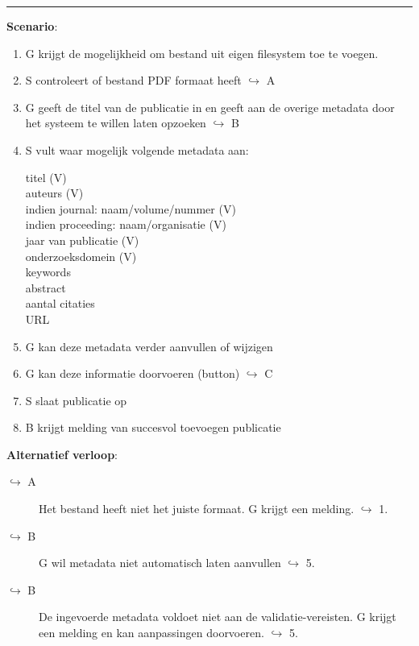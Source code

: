 \hrule
\vspace{2 mm}
\noindent \textbf{Scenario}:
\begin{enumerate}
\item G krijgt de mogelijkheid om bestand uit eigen filesystem toe te voegen.
\item S controleert of bestand PDF formaat heeft $\hookrightarrow$ A
\item G geeft de titel van de publicatie in en geeft aan de overige metadata door het systeem te willen laten opzoeken $\hookrightarrow$ B
\item S vult waar mogelijk volgende metadata aan:
\begin{description}
  \item[titel (V)]  \hfill 
  \item[auteurs (V) ] \hfill 
  \item[indien journal: naam/volume/nummer (V)] \hfill 
  \item[indien proceeding: naam/organisatie (V)] \hfill 
  \item[jaar van publicatie (V) ] \hfill 
  \item[onderzoeksdomein (V)]  \hfill 
  \item[keywords]  \hfill 
  \item[abstract] \hfill 
   \item[aantal citaties] \hfill 
    \item[URL] \hfill 
  \end{description}
\item G kan deze metadata verder aanvullen of wijzigen 
 \item G kan deze informatie doorvoeren (button)  $\hookrightarrow$ C
 \item S slaat publicatie op   
 \item B krijgt melding van succesvol toevoegen publicatie 
\end{enumerate}
\noindent \textbf{Alternatief verloop}:
\begin{description}
\item[ $\hookrightarrow$ A] Het bestand heeft niet het juiste formaat. G krijgt een melding. $\hookrightarrow$ 1.
\item[ $\hookrightarrow$ B] G wil metadata niet automatisch laten aanvullen $\hookrightarrow$ 5.
\item[ $\hookrightarrow$ B] De ingevoerde metadata voldoet niet aan de validatie-vereisten. G krijgt een melding en kan aanpassingen doorvoeren. $\hookrightarrow$ 5.
\end{description}

